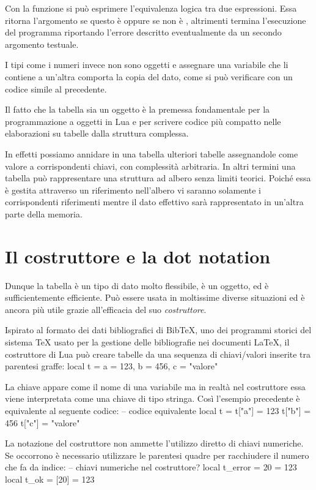 Con la funzione  si può esprimere l'equivalenza logica tra due
espressioni. Essa ritorna l'argomento se questo è  oppure se non è
, altrimenti termina l'esecuzione del programma riportando l'errore
descritto eventualmente da un secondo argomento testuale.

I tipi come i numeri invece non sono oggetti e assegnare una variabile che li
contiene a un'altra comporta la copia del dato, come si può verificare con un
codice simile al precedente.

Il fatto che la tabella sia un oggetto è la premessa fondamentale per la
programmazione a oggetti in Lua e per scrivere codice più compatto nelle
elaborazioni su tabelle dalla struttura complessa.

In effetti possiamo annidare in una tabella ulteriori tabelle assegnandole come
valore a corrispondenti chiavi, con complessità arbitraria. In altri termini una
tabella può rappresentare una struttura ad albero senza limiti teorici. Poiché
essa è gestita attraverso un riferimento nell'albero vi saranno solamente i
corrispondenti riferimenti mentre il dato effettivo sarà rappresentato in
un'altra parte della memoria.


\section{Il costruttore e la dot notation}

Dunque la tabella è un tipo di dato molto flessibile, è un oggetto, ed è
sufficientemente efficiente. Può essere usata in moltissime diverse situazioni
ed è ancora più utile grazie all'efficacia del suo \emph{costruttore}.

Ispirato al formato dei dati bibliografici di BibTeX, uno dei programmi storici
del sistema \TeX{} usato per la gestione delle bibliografie nei documenti
\LaTeX, il costruttore di Lua può creare tabelle da una sequenza di
chiavi/valori inserite tra parentesi graffe:
\lines
local t = { a = 123, b = 456, c = "valore" }
\endlines
{}

La chiave appare come il nome di una variabile ma in realtà nel costruttore
essa viene interpretata come una chiave di tipo stringa. Così l'esempio
precedente è equivalente al seguente codice:
\lines
-- codice equivalente
local t = {}
t["a"] = 123
t["b"] = 456
t["c"] = "valore"
\endlines
{}

La notazione del costruttore non ammette l'utilizzo diretto di chiavi
numeriche. Se occorrono è necessario utilizzare le parentesi quadre per
racchiudere il numero che fa da indice:
\lines
-- chiavi numeriche nel costruttore?
local t_error = { 20 = 123 }
local t_ok = { [20] = 123 }
\endlines
{}


